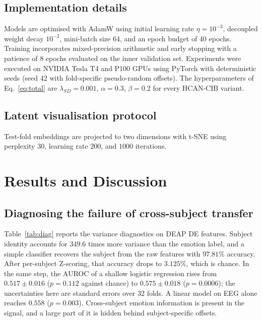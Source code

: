 \documentclass[a4paper,fleqn]{cas-sc}
\begin{document}
\subsection{Implementation details}
Models are optimised with AdamW using initial learning rate $\eta=10^{-3}$, decoupled weight decay $10^{-2}$, mini-batch size 64, and an epoch budget of 40 epochs. Training incorporates mixed-precision arithmetic and early stopping with a patience of 8 epochs evaluated on the inner validation set. Experiments were executed on NVIDIA Tesla T4 and P100 GPUs using PyTorch with deterministic seeds (seed 42 with fold-specific pseudo-random offsets). The hyperparameters of Eq.~\eqref{eq:total} are $\lambda_{SD}=0.001$, $\alpha=0.3$, $\beta=0.2$ for every HCAN-CIB variant.

\subsection{Latent visualisation protocol}
Test-fold embeddings are projected to two dimensions with t-SNE \citep{bohm2022unsupervised} using perplexity $30$, learning rate $200$, and $1000$ iterations.

\section{Results and Discussion}
\label{sec:results}

\subsection{Diagnosing the failure of cross-subject transfer}
Table~\ref{tab:diag} reports the variance diagnostics on DEAP DE features. Subject identity accounts for $349.6$ times more variance than the emotion label, and a simple classifier recovers the subject from the raw features with $97.81\%$ accuracy. After per-subject Z-scoring, that accuracy drops to $3.125\%$, which is chance. In the same step, the AUROC of a shallow logistic regression rises from $0.517\pm0.016$ ($p=0.112$ against chance) to $0.575\pm0.018$ ($p=0.0006$); the uncertainties here are standard errors over 32 folds. A linear model on EEG alone reaches $0.558$ ($p=0.003$). Cross-subject emotion information is present in the signal, and a large part of it is hidden behind subject-specific offsets.
\end{document}
